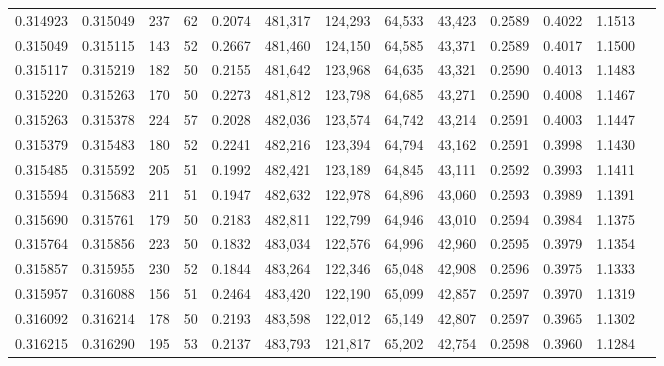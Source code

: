 \begin{tabular}{rrrrrrrrrrrrr}
0.314923 & 0.315049 &   237 &  62 &                                     0.2074 & 481,317 & 124,293 &  64,533 &  43,423 & 0.2589 & 0.4022 & 1.1513 \\
0.315049 & 0.315115 &   143 &  52 &                                     0.2667 & 481,460 & 124,150 &  64,585 &  43,371 & 0.2589 & 0.4017 & 1.1500 \\
0.315117 & 0.315219 &   182 &  50 &                                     0.2155 & 481,642 & 123,968 &  64,635 &  43,321 & 0.2590 & 0.4013 & 1.1483 \\
0.315220 & 0.315263 &   170 &  50 &                                     0.2273 & 481,812 & 123,798 &  64,685 &  43,271 & 0.2590 & 0.4008 & 1.1467 \\
0.315263 & 0.315378 &   224 &  57 &                                     0.2028 & 482,036 & 123,574 &  64,742 &  43,214 & 0.2591 & 0.4003 & 1.1447 \\
0.315379 & 0.315483 &   180 &  52 &                                     0.2241 & 482,216 & 123,394 &  64,794 &  43,162 & 0.2591 & 0.3998 & 1.1430 \\
0.315485 & 0.315592 &   205 &  51 &                                     0.1992 & 482,421 & 123,189 &  64,845 &  43,111 & 0.2592 & 0.3993 & 1.1411 \\
0.315594 & 0.315683 &   211 &  51 &                                     0.1947 & 482,632 & 122,978 &  64,896 &  43,060 & 0.2593 & 0.3989 & 1.1391 \\
0.315690 & 0.315761 &   179 &  50 &                                     0.2183 & 482,811 & 122,799 &  64,946 &  43,010 & 0.2594 & 0.3984 & 1.1375 \\
0.315764 & 0.315856 &   223 &  50 &                                     0.1832 & 483,034 & 122,576 &  64,996 &  42,960 & 0.2595 & 0.3979 & 1.1354 \\
0.315857 & 0.315955 &   230 &  52 &                                     0.1844 & 483,264 & 122,346 &  65,048 &  42,908 & 0.2596 & 0.3975 & 1.1333 \\
0.315957 & 0.316088 &   156 &  51 &                                     0.2464 & 483,420 & 122,190 &  65,099 &  42,857 & 0.2597 & 0.3970 & 1.1319 \\
0.316092 & 0.316214 &   178 &  50 &                                     0.2193 & 483,598 & 122,012 &  65,149 &  42,807 & 0.2597 & 0.3965 & 1.1302 \\
0.316215 & 0.316290 &   195 &  53 &                                     0.2137 & 483,793 & 121,817 &  65,202 &  42,754 & 0.2598 & 0.3960 & 1.1284 \\

\end{tabular}
